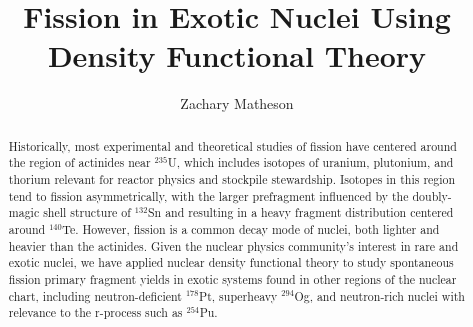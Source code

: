 \documentclass{msuphddissertation}
\author{Zachary Matheson} %
\title{Fission in Exotic Nuclei Using Density Functional Theory} %
\newcommand{\Og}{$^{294}$Og}
\newcommand{\Pt}{$^{178}$Pt}
\begin{document}
\maketitlepage %


\begin{abstract}
Historically, most experimental and theoretical studies of fission have centered around the region of actinides near $^{235}$U, which includes isotopes of uranium, plutonium, and thorium relevant for reactor physics and stockpile stewardship. Isotopes in this region tend to fission asymmetrically, with the larger prefragment influenced by the doubly-magic shell structure of $^{132}$Sn and resulting in a heavy fragment distribution centered around $^{140}$Te. However, fission is a common decay mode of nuclei, both lighter and heavier than the actinides. Given the nuclear physics community's interest in rare and exotic nuclei, we have applied nuclear density functional theory to study spontaneous fission primary fragment yields in exotic systems found in other regions of the nuclear chart, including neutron-deficient {\Pt}, superheavy {\Og}, and neutron-rich nuclei with relevance to the r-process such as $^{254}$Pu.
\end{abstract}

\end{document}
